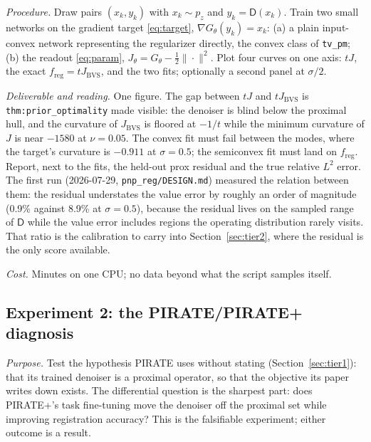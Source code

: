 \documentclass[11pt]{article}
\theoremstyle{definition}
\newcommand{\D}{\mathsf{D}}
\newcommand{\freg}{f_{\mathrm{reg}}}
\newcommand{\code}[1]{\texttt{#1}}
\newcommand{\Jbvs}{J_{\mathrm{BVS}}}
\begin{document}
\emph{Procedure.} Draw pairs $(x_k, y_k)$ with $x_k \sim p_z$ and $y_k = \D(x_k)$. Train two small networks on the gradient target \eqref{eq:target}, $\nabla G_\theta(y_k) = x_k$: (a) a plain input-convex network representing the regularizer directly, the convex class of \code{tv\_pm}; (b) the readout \eqref{eq:param}, $J_\theta = G_\theta - \tfrac12\|\cdot\|^2$. Plot four curves on one axis: $tJ$, the exact $\freg = t\Jbvs$, and the two fits; optionally a second panel at $\sigma/2$.

\emph{Deliverable and reading.} One figure. The gap between $tJ$ and $t\Jbvs$ is \code{thm:prior\_optimality} made visible: the denoiser is blind below the proximal hull, and the curvature of $\Jbvs$ is floored at $-1/t$ while the minimum curvature of $J$ is near $-1580$ at $\nu = 0.05$. The convex fit must fail between the modes, where the target's curvature is $-0.911$ at $\sigma = 0.5$; the semiconvex fit must land on $\freg$. Report, next to the fits, the held-out prox residual and the true relative $L^2$ error. The first run (2026-07-29, \code{pnp\_reg/DESIGN.md}) measured the relation between them: the residual understates the value error by roughly an order of magnitude (0.9\% against 8.9\% at $\sigma = 0.5$), because the residual lives on the sampled range of $\D$ while the value error includes regions the operating distribution rarely visits. That ratio is the calibration to carry into Section~\ref{sec:tier2}, where the residual is the only score available.

\emph{Cost.} Minutes on one CPU; no data beyond what the script samples itself.

\subsection{Experiment 2: the PIRATE/PIRATE+ diagnosis}
\label{sec:exp2}

\emph{Purpose.} Test the hypothesis PIRATE uses without stating (Section~\ref{sec:tier1}): that its trained denoiser is a proximal operator, so that the objective its paper writes down exists. The differential question is the sharpest part: does PIRATE+'s task fine-tuning move the denoiser off the proximal set while improving registration accuracy? This is the falsifiable experiment; either outcome is a result.
\end{document}
